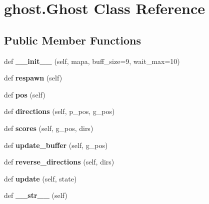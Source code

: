 \hypertarget{classghost_1_1_ghost}{}\section{ghost.\+Ghost Class Reference}
\label{classghost_1_1_ghost}
\subsection*{Public Member Functions}
\begin{DoxyCompactItemize}
\item 
\mbox{\label{classghost_1_1_ghost_ac8f0ca36bc72789d135aff3168572840}} 
def {\bfseries \+\_\+\+\_\+init\+\_\+\+\_\+} (self, mapa, buff\+\_\+size=9, wait\+\_\+max=10)
\item 
\mbox{\label{classghost_1_1_ghost_a6471a3d86cd42435aa191c9472e61428}} 
def {\bfseries respawn} (self)
\item 
\mbox{\label{classghost_1_1_ghost_abed825364965c727030441fa31e053f7}} 
def {\bfseries pos} (self)
\item 
\mbox{\label{classghost_1_1_ghost_a1efaa02ec6f66c1bfdc6ea6d44f2cd46}} 
def {\bfseries directions} (self, p\+\_\+pos, g\+\_\+pos)
\item 
\mbox{\label{classghost_1_1_ghost_ab76511e77cc1889e86efeadebf8ffafa}} 
def {\bfseries scores} (self, g\+\_\+pos, dirs)
\item 
\mbox{\label{classghost_1_1_ghost_a610c0a810ad4f7d55f7eb8eef32c2b86}} 
def {\bfseries update\+\_\+buffer} (self, g\+\_\+pos)
\item 
\mbox{\label{classghost_1_1_ghost_ad3a6e57e178d1ff073a0c3a8e02329e2}} 
def {\bfseries reverse\+\_\+directions} (self, dirs)
\item 
\mbox{\label{classghost_1_1_ghost_ad9579dfce6786f5bb73ff3e82edf1976}} 
def {\bfseries update} (self, state)
\item 
\mbox{\label{classghost_1_1_ghost_a9f8631704ac24f7818c04672f0004fea}} 
def {\bfseries \+\_\+\+\_\+str\+\_\+\+\_\+} (self)
\end{DoxyCompactItemize}
